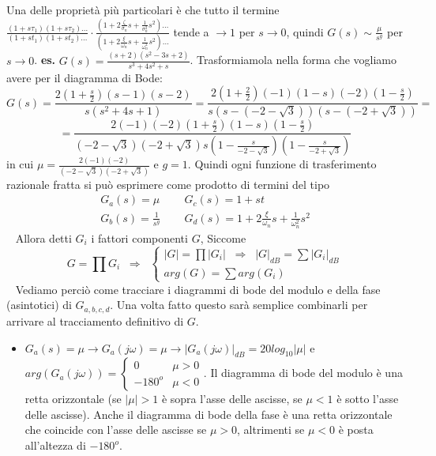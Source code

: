 \newline
Una delle proprietà più particolari è che tutto il termine $\frac{(1 + s \tau_1)(1 + s \tau_2)\dots}{(1 + s t_1)(1 + s t_2)\dots} \cdot \frac{(1 + 2 \frac{\zeta}{\sigma_n}s + \frac{1}{\sigma_n^2}s^2)\dots}{(1 + 2 \frac{\xi}{\omega_n} s + \frac{1}{\omega_n^2}s^2)\dots}$ tende a $\rightarrow  1$ per $s \rightarrow 0$, quindi $G(s) \sim \frac{\mu}{s^g}$ per $s \rightarrow  0$.\newline
\newline
\textbf{es.} $G(s) = \frac{(s+2)(s^2-3s+2)}{s^3 + 4 s^2 + s}$.\newline
Trasformiamola nella forma che vogliamo avere per il diagramma di Bode:
\[
    G(s) = \frac{2(1+\frac{s}{2})(s-1)(s-2)}{s(s^2+4s+1)} = \frac{2(1+ \frac{2}{2})(-1)(1-s)(-2)(1-\frac{s}{2})}{s(s-(-2-\sqrt{3}))(s-(-2+\sqrt{3}))}=
\]
\[
    = \frac{2(-1)(-2)(1+\frac{s}{2})(1-s)(1-\frac{s}{2})}{(-2-\sqrt{3})(-2+\sqrt{3})s(1-\frac{s}{-2-\sqrt{3}})(1-\frac{s}{-2+\sqrt{3}})}
\]
in cui $\mu= \frac{2(-1)(-2)}{(-2-\sqrt{3})(-2+\sqrt{3})}$ e $g=1$.\newline
\newline
\newline
Quindi ogni funzione di trasferimento razionale fratta si può esprimere come prodotto di termini del tipo 
\[
    \begin{matrix}
        G_a(s) = \mu & \;\; & G_c(s) = 1+ s t\\
        G_b(s) = \frac{1}{s^g} & \;\; & G_d(s) = 1 + 2 \frac{\xi}{\omega_n}s + \frac{1}{\omega_n^2}s^2
    \end{matrix}
\]
\ \newline
\newline
Allora detti $G_i$ i fattori componenti $G$, Siccome
\[
    G=\prod G_i \;\; \Longrightarrow \;\; \begin{cases}
        |G| = \prod |G_i| \;\; \Longrightarrow \;\; |G|_{dB} = \sum |G_i|_{dB}\\
        arg(G) = \sum arg(G_i)
    \end{cases}
\]
\ \newline
\newline
Vediamo perciò come tracciare i diagrammi di bode del modulo e della fase (asintotici) di $G_{a,b,c,d}$. Una volta fatto questo sarà semplice combinarli per arrivare al tracciamento definitivo di $G$.
\begin{itemize}
    \item $G_a(s) = \mu \rightarrow  G_a(j \omega) = \mu \rightarrow |G_a(j \omega)|_{dB} = 20 log_10|\mu|$ e $arg(G_a(j \omega)) = \begin{cases}
        0 \;\;\; & \mu>0\\
        -180^o & \mu<0
    \end{cases}$.\newline
    Il diagramma di bode del modulo è una retta orizzontale (se $|\mu| > 1$ è sopra l'asse delle ascisse, se $\mu < 1$ è sotto l'asse delle ascisse).\newline
    Anche il diagramma di bode della fase è una retta orizzontale che coincide con l'asse delle ascisse se $\mu>0$, altrimenti se $\mu<0$ è posta all'altezza di $-180^o$.
\end{itemize}